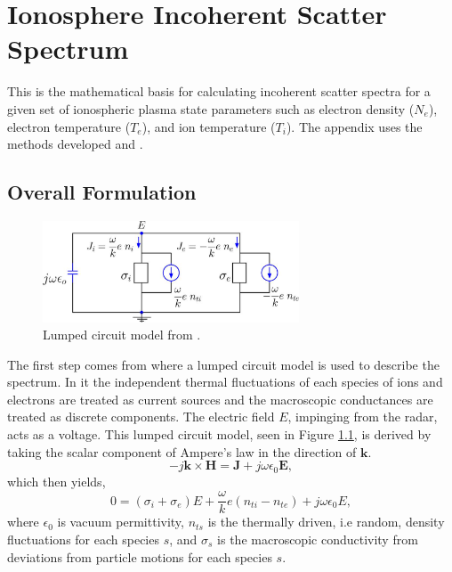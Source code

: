 \chapter{Ionosphere Incoherent Scatter Spectrum}
\label{appendix1}
\thispagestyle{myheadings}
\graphicspath{{Appendix/Figures/}}


This is the mathematical basis for calculating incoherent scatter spectra for a given set of ionospheric plasma state parameters such as electron density ($N_e$), electron temperature ($T_e$),  and ion temperature ($T_i$). The appendix uses the methods developed \citet{kudeki:milla:1} and \citet{Kudeki:2006kx}.

\section{Overall Formulation}

\begin{figure}[htb]
\centering
\includegraphics[width=3.0in]{circuit}
\caption{Lumped circuit model from  \citep{kudeki:milla:1}.}
\label{fig:circuit}
\end{figure}

The first step comes from \citep{kudeki:milla:1} where a lumped circuit model is used to describe the spectrum. In it the independent thermal fluctuations of each species of ions and electrons are treated as current sources and the macroscopic conductances are treated as discrete components. The electric field $E$, impinging from the radar, acts as a voltage. This lumped circuit model, seen in Figure \ref{fig:circuit}, is derived by taking the scalar component of Ampere's law in the direction of $\mathbf{k}$.
\begin{equation}
\label{eq:ampere}
-j\mathbf{k} \times \mathbf{H} = \mathbf{J} +j\omega \epsilon_0 \mathbf{E},
\end{equation}
which then yields,
\begin{equation} 
\label{eq:ampscaler}
0=(\sigma_i +\sigma_e)E +\frac{\omega}{k}e(n_{ti}-n_{te}) +j\omega \epsilon_0 E,
\end{equation}
where $ \epsilon_0$ is vacuum permittivity, $n_{ts}$ is the thermally driven, i.e random, density fluctuations for each species $s$, and $\sigma_s$ is the macroscopic conductivity from deviations from particle motions for each species $s$. 

